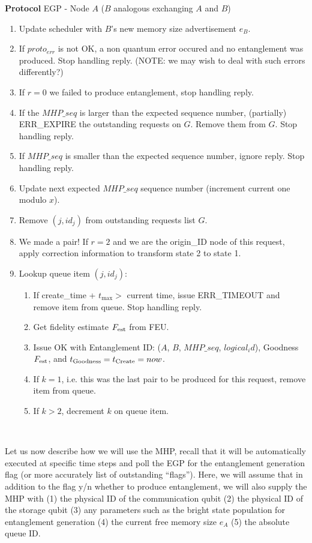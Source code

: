 \documentclass{article}
\makeatletter
\newcounter{Lprotocol}
\newenvironment{Lprotocol}[1]
  {\par\addvspace{\topsep}
   \noindent
   \tabularx{\linewidth}{@{} X @{}}
    \hline
    \refstepcounter{Lprotocol}\textbf{Protocol \theLprotocol} #1 \\
    \hline}
  { \\
    \hline
   \endtabularx
   \par\addvspace{\topsep}}
\makeatother
\begin{document}
\begin{Lprotocol}{EGP - Node $A$ ($B$ analogous exchanging $A$ and $B$)}
\begin{enumerate}
\begin{enumerate}
   \item Update scheduler with $B$'s new memory size advertisement $e_B$.
   \item If $proto_{err}$ is not OK, a non quantum error occured and no entanglement was produced. Stop handling reply. (NOTE: we may wish to deal with such errors differently?)
   \item If $r = 0$ we failed to produce entanglement, stop handling reply.
   \item If the $MHP\_seq$ is larger than the expected sequence number, (partially) ERR\_EXPIRE the outstanding
	requests on $G$. Remove them from $G$. Stop handling reply.
   \item If $MHP\_seq$ is smaller than the expected sequence number, ignore reply. Stop handling reply.
   \item Update next expected $MHP\_seq$ sequence number (increment current one modulo $x$).
   \item Remove $(j,id_j)$ from outstanding requests list $G$.
   \item We made a pair! If $r=2$ and we are the origin\_ID node of this request, apply correction information to transform state 2 to state 1.
   \item Lookup queue item $(j,id_j)$: 
	\begin{enumerate}
		\item If create\_time + $t_{\max} >$ current time, issue ERR\_TIMEOUT and remove item from queue. Stop handling reply.
		\item Get fidelity estimate $F_{\rm est}$ from FEU.
		\item Issue OK with Entanglement ID: ($A$, $B$, $MHP\_seq$, $logical_id$), Goodness $F_{\rm est}$, and $t_{\rm Goodness} = t_{\rm Create} = now$.
		\item If $k = 1$, i.e. this was the last pair to be produced for this request, remove item from queue.
		\item If $k > 2$, decrement $k$ on queue item.
	\end{enumerate}
   \end{enumerate}
\end{enumerate}

\end{Lprotocol}

Let us now describe how we will use the MHP, recall that it will be automatically executed at specific time steps and poll the EGP for the entanglement generation flag (or more accurately list of outstanding ``flags''). Here, we will assume that in addition to the flag y/n whether to produce entanglement, we will also supply the MHP with (1) the physical ID of the communication qubit (2) the physical ID of the storage qubit (3) any parameters such as the bright state population for entanglement generation (4) the current free memory size $e_A$  (5) the absolute queue ID.
\end{document}
